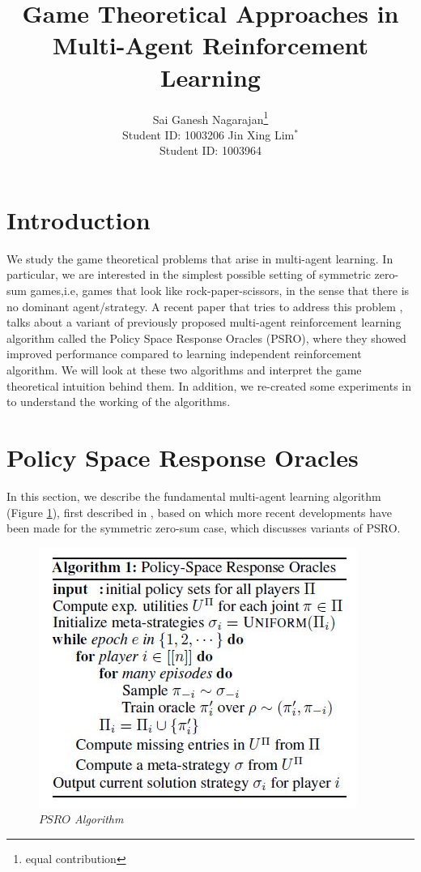 \documentclass{article}
\title{Game Theoretical Approaches in \\ Multi-Agent Reinforcement Learning}
\author{
Sai Ganesh Nagarajan\footnote{equal contribution}\\
Student ID: 1003206
\And
Jin Xing Lim$^\ast$ \\
Student ID: 1003964  %
}
\begin{document}

\maketitle

\section{Introduction}
We study the game theoretical problems that arise in multi-agent learning. In particular, we are interested in the simplest possible setting of symmetric zero-sum games,i.e, games that look like rock-paper-scissors, in the sense that there is no dominant agent/strategy. A recent paper that tries to address this problem \cite{Balduzzi2019OpenendedLI}, talks about a variant of previously proposed multi-agent reinforcement learning algorithm \cite{NIPS2017_7007} called the Policy Space Response Oracles (PSRO), where they showed improved performance compared to learning independent reinforcement algorithm. We will look at these two algorithms and interpret the game theoretical intuition behind them. In addition, we re-created some experiments in \cite{Balduzzi2019OpenendedLI} to understand the working of the algorithms.

\section{Policy Space Response Oracles}
In this section, we describe the fundamental multi-agent learning algorithm (Figure \ref{fig:psro_marl}), first described in \cite{NIPS2017_7007}, based on which more recent developments have been made for the symmetric zero-sum case, which discusses variants of PSRO.

\begin{figure}[!ht]
	\centering
	\includegraphics[scale=0.6]{PSRO_marl}
	\caption{\textit{$PSRO$ Algorithm}}
	\label{fig:psro_marl}
\end{figure}
\end{document}
